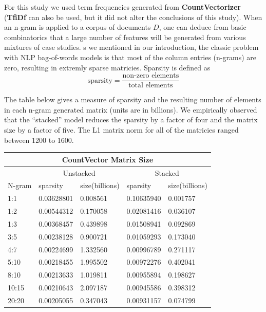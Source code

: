 \documentclass[11pt]{article}
\newcommand{\vertSpace}[1]{\vspace{3mm}}
\begin{document}
{\noindent For this study we used term frequencies generated from \textbf{CountVectorizer} (\textbf{TfiDf} can also be used, but it did not alter the conclusions of this study).  When an n-gram is applied to a corpus of documents $D$, one can deduce from basic combinatorics that a large number of features will be generated from various mixtures of case studies.  \vertSpace

As we mentioned in our introduction, the classic problem with NLP bag-of-words models is that most of the column entries (n-grams) are zero, resulting in extremly sparse matricies.  
Sparsity is defined as
\begin{equation*}
\mbox{sparsity} = \frac{\mbox{non-zero elements}}{\mbox{total elements}}
\end{equation*}

The table below gives a measure of sparsity  and the resulting number of elements in each n-gram generated matrix (units are in billions).  We empirically observed that the ``stacked'' model reduces the sparsity by a factor of four and the matrix size by a factor of five. The L1 matrix norm for all of the matricies ranged between 1200 to 1600.\\

\noindent 
\begin{center}
\begin{tabular}{ |p{2cm}||p{2cm}|p{2cm}|p{2cm}|p{2cm}|  }
 \hline
 \multicolumn{5}{|c|}{CountVector Matrix Size} \\
 \hline
 \multicolumn{1}{|c|}{} &
 \multicolumn{2}{|c|}{Unstacked} &
 \multicolumn{2}{|c|}{Stacked}\\
 \hline
 N-gram & sparsity & size(billions) & sparsity & size(billions)\\
 \hline
       1:1& 0.03628801& 0.008561&  0.10635940&   0.001757 \\
       1:2& 0.00544312& 0.170058&  0.02081416&    0.036107\\
       1:3& 0.00368457& 0.439898&  0.01508941&     0.092869\\
       3:5& 0.00238128& 0.900721&  0.01059293&     0.173040\\
       4:7& 0.00224699& 1.332560&  0.00996789&     0.271117\\
      5:10& 0.00218455& 1.995502&  0.00972276&     0.402041\\
      8:10& 0.00213633& 1.019811&  0.00955894&     0.198627\\
     10:15& 0.00210643& 2.097187&  0.00945586&     0.398312\\
     20:20& 0.00205055& 0.347043&  0.00931157&     0.074799\\
 \hline
\end{tabular}
\end{center}




}
\end{document}
